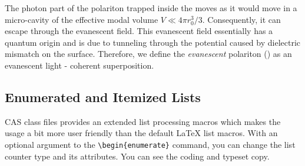 \documentclass[a4paper,12pt]{article}
\begin{document}
\begin{enumerate}
\begin{vquote}
\begin{pot}
 The photon part of the polariton trapped inside the \PMS
 moves as it would move in a micro-cavity of the effective
 modal volume $V \ll 4 \pi r_{0}^{3} /3$. Consequently, it
 can escape through the evanescent field. This evanescent
 field essentially has a quantum origin and is due to
 tunneling through the potential caused by dielectric
 mismatch on the \PMS surface. Therefore, we define the
 \emph{evanescent} polariton (\EP) as an evanescent light -
 \QE coherent superposition.
\end{pot}
\end{vquote}

\end{enumerate}

\subsection{Enumerated and Itemized Lists}

CAS class files provides an extended list processing macros
which makes the usage a bit more user friendly than the
default LaTeX list macros. With an optional argument to the
\verb+\begin{enumerate}+ command, you can change the list
counter type and its attributes. You can see the coding and
typeset copy. 

\end{document}
